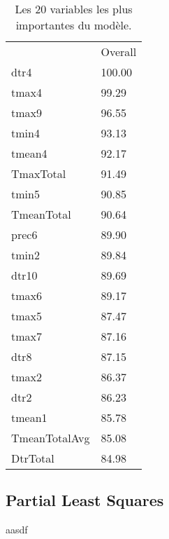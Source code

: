 \begin{table}[H]
	\centering
	\caption{Les 20 variables les plus importantes du modèle.}
	\label{RF_Dulzor_Varimp}
	\begin{tabular}{ll}
              & Overall \\
dtr4          & 100.00  \\
tmax4         & 99.29   \\
tmax9         & 96.55   \\
tmin4         & 93.13   \\
tmean4        & 92.17   \\
TmaxTotal     & 91.49   \\
tmin5         & 90.85   \\
TmeanTotal    & 90.64   \\
prec6         & 89.90   \\
tmin2         & 89.84   \\
dtr10         & 89.69   \\
tmax6         & 89.17   \\
tmax5         & 87.47   \\
tmax7         & 87.16   \\
dtr8          & 87.15   \\
tmax2         & 86.37   \\
dtr2          & 86.23   \\
tmean1        & 85.78   \\
TmeanTotalAvg & 85.08   \\
DtrTotal      & 84.98
	\end{tabular}
\end{table}







































\newpage

\subsection{Partial Least Squares}
aasdf


